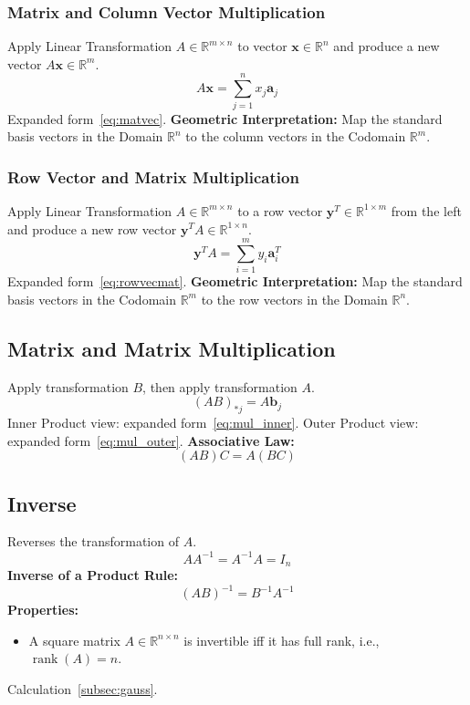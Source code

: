 \documentclass{article}
\begin{document}
\subsubsection{Matrix and Column Vector Multiplication}
Apply Linear Transformation $A \in \mathbb{R}^{m \times n}$ to vector $\mathbf{x} \in \mathbb{R}^n$ and produce a new vector $A\mathbf{x} \in \mathbb{R}^m$.
\[
    A\mathbf{x} = \sum_{j=1}^n x_j \mathbf{a}_j
\]
Expanded form~\ref{eq:matvec}.
\newline
\textbf{Geometric Interpretation:} Map the standard basis vectors in the Domain $\mathbb{R}^n$ to the column vectors in the Codomain $\mathbb{R}^m$.

\subsubsection{Row Vector and Matrix Multiplication}
Apply Linear Transformation $A \in \mathbb{R}^{m \times n}$ to a row vector $\mathbf{y}^T \in \mathbb{R}^{1 \times m}$ from the left and produce a new row vector $\mathbf{y}^T A \in \mathbb{R}^{1 \times n}$.
\[
    \mathbf{y}^T A = \sum_{i=1}^m y_i \mathbf{a}_i^T
\]
Expanded form~\ref{eq:rowvecmat}.
\newline
\textbf{Geometric Interpretation:} Map the standard basis vectors in the Codomain $\mathbb{R}^m$ to the row vectors in the Domain $\mathbb{R}^n$.

\subsection{Matrix and Matrix Multiplication}
Apply transformation $B$, then apply transformation $A$.
\[
    (AB)_{*j} = A\mathbf{b}_j
\]
Inner Product view: expanded form~\ref{eq:mul_inner}.
\newline
Outer Product view: expanded form~\ref{eq:mul_outer}.
\newline
\textbf{Associative Law:}
\[
    (AB)C = A(BC)
\]

\subsection{Inverse}
Reverses the transformation of $A$.
\[
    A A^{-1} = A^{-1} A = I_n
\]
\textbf{Inverse of a Product Rule:}
\[
    (AB)^{-1} = B^{-1}A^{-1}
\]
\textbf{Properties:}
\begin{itemize}
    \item A square matrix $A \in \mathbb{R}^{n \times n}$ is invertible iff it has full rank, i.e., $\operatorname{rank}(A) = n$.
\end{itemize}
Calculation~\ref{subsec:gauss}.
\end{document}
